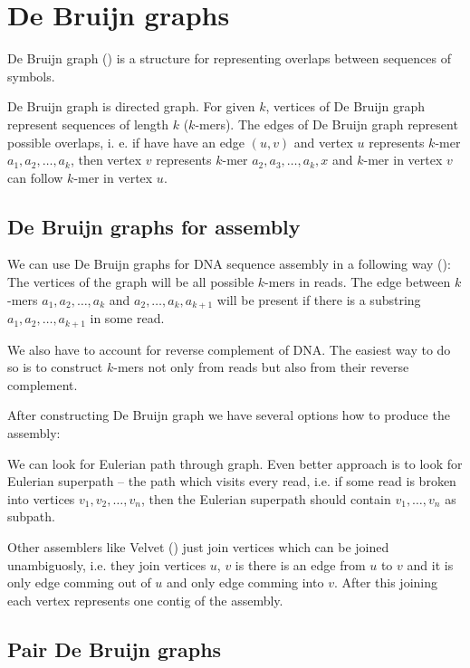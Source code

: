 \chapter{De Bruijn graphs}

De Bruijn graph (\cite{de1946combinatorial}) is a structure for representing
overlaps between sequences of symbols.

De Bruijn graph is directed graph. 
For given $k$, vertices of De Bruijn graph represent sequences of length $k$
($k$-mers). The edges of De Bruijn graph represent possible overlaps, i. e. 
if have have an edge $(u, v)$ and vertex $u$ represents $k$-mer $a_1, a_2, \dots, a_k$, then
vertex $v$ represents $k$-mer $a_2, a_3, \dots, a_k, x$ and $k$-mer in vertex $v$ can
follow $k$-mer in vertex $u$.

\section{De Bruijn graphs for assembly}

We can use De Bruijn graphs for DNA sequence assembly in a following way
(\cite{pevzner2001eulerian}):
The vertices of the graph will be all possible $k$-mers in reads. 
The edge between $k$-mers $a_1, a_2, \dots, a_k$ and $a_2, \dots, a_k, a_{k+1}$
will be present if there is a substring $a_1, a_2, \dots, a_{k+1}$ in some read.

We also have to account for reverse complement of DNA. The easiest way to do so
is to construct $k$-mers not only from reads but also from their reverse complement.

After constructing De Bruijn graph we have several options how to produce the assembly:

We can look for Eulerian path through graph. Even better approach is to look for
Eulerian superpath -- the path which visits every read, i.e. if some read
is broken into vertices $v_1, v_2, \dots, v_n$, then the Eulerian superpath
should contain $v_1, \dots, v_n$ as subpath.

Other assemblers like Velvet (\cite{Velvet}) just join vertices which can be joined
unambiguosly, i.e. they join vertices $u$, $v$ is there is an edge from $u$ to $v$ and
it is only edge comming out of $u$ and only edge comming into $v$. After this joining
each vertex represents one contig of the assembly.

\section{Pair De Bruijn graphs}


